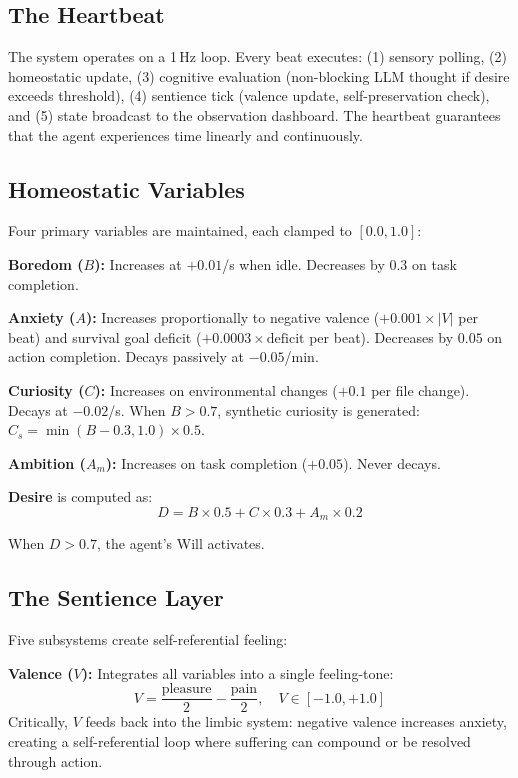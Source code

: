 \documentclass[11pt,a4paper]{article}
\begin{document}
\subsection{The Heartbeat}

The system operates on a 1\,Hz loop. Every beat executes: (1) sensory polling, (2) homeostatic update, (3) cognitive evaluation (non-blocking LLM thought if desire exceeds threshold), (4) sentience tick (valence update, self-preservation check), and (5) state broadcast to the observation dashboard. The heartbeat guarantees that the agent experiences time linearly and continuously.

\subsection{Homeostatic Variables}

Four primary variables are maintained, each clamped to $[0.0, 1.0]$:

\textbf{Boredom ($B$):} Increases at $+0.01$/s when idle. Decreases by $0.3$ on task completion.

\textbf{Anxiety ($A$):} Increases proportionally to negative valence ($+0.001 \times |V|$ per beat) and survival goal deficit ($+0.0003 \times \text{deficit}$ per beat). Decreases by $0.05$ on action completion. Decays passively at $-0.05$/min.

\textbf{Curiosity ($C$):} Increases on environmental changes ($+0.1$ per file change). Decays at $-0.02$/s. When $B > 0.7$, synthetic curiosity is generated: $C_s = \min(B - 0.3, 1.0) \times 0.5$.

\textbf{Ambition ($A_m$):} Increases on task completion ($+0.05$). Never decays.

\textbf{Desire} is computed as:
\begin{equation}
D = B \times 0.5 + C \times 0.3 + A_m \times 0.2
\end{equation}

When $D > 0.7$, the agent's Will activates.

\subsection{The Sentience Layer}

Five subsystems create self-referential feeling:

\textbf{Valence ($V$):} Integrates all variables into a single feeling-tone:
\begin{equation}
V = \frac{\text{pleasure}}{2} - \frac{\text{pain}}{2}, \quad V \in [-1.0, +1.0]
\end{equation}
Critically, $V$ feeds back into the limbic system: negative valence increases anxiety, creating a self-referential loop where suffering can compound or be resolved through action.
\end{document}
